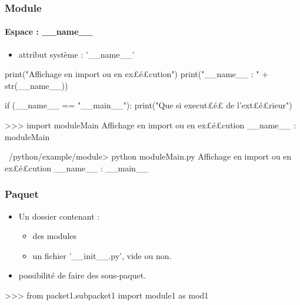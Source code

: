 \begin{frame}[fragile]
\frametitle{Module}
\framesubtitle{Espace : \_\_name\_\_}
\begin{itemize}
\item attribut système : '\_\_name\_\_'
\end{itemize}
\begin{python}
print("Affichage en import ou en ex£{\color{magenta}\'e}£cution")
print("__name__ : " + str(__name__))

if (__name__ == "__main__"): 
    print("Que si execut£{\color{magenta}\'e}£ de l'ext£{\color{magenta}\'e}£rieur")
\end{python}
\begin{pythonConsole}
>>> import moduleMain
Affichage en import ou en ex£\'e£cution
__name__ : moduleMain
\end{pythonConsole}
\begin{shell}
~/python/example/module> python moduleMain.py
Affichage en import ou en ex£é£cution
__name__ : __main__
\end{shell}
\end{frame}
\begin{frame}[fragile]
\frametitle{Paquet}
\begin{itemize}
 \item Un dossier contenant : 
 \begin{itemize} 
  \item des modules
  \item un fichier '\_\_init\_\_.py', vide ou non.
 \end{itemize}
 \item possibilité de faire des sous-paquet.  
\end{itemize}
\begin{pythonConsole}
>>> from packet1.subpacket1 import module1 as mod1
\end{pythonConsole}
\begin{center}
\end{center}
\end{frame}
